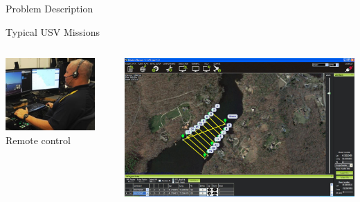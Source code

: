 \documentclass[9pt]{beamer}
\begin{document}
\begin{frame}{Problem Description} \label{PD:missions}
    \begin{block}{Typical USV Missions}
        \begin{columns}
            \begin{column}{0.5\textwidth}
                \begin{block}{}
                    \begin{center}
                        \includegraphics[width=0.85\textwidth]{img/traditional.JPG}
                        \vline
                        \linebreak
                        Remote control
                    \end{center}
                \end{block}
            \end{column}
            \begin{column}{0.5\textwidth}
                \begin{block}{}
                    \begin{center}
                        \includegraphics[width=\textwidth,trim={2cm 2cm 8cm 2cm},clip]{img/Jetyak4Waypoints.jpg}

\end{center}
\end{block}
\end{column}
\end{columns}
\end{block}
\end{frame}
\end{document}

